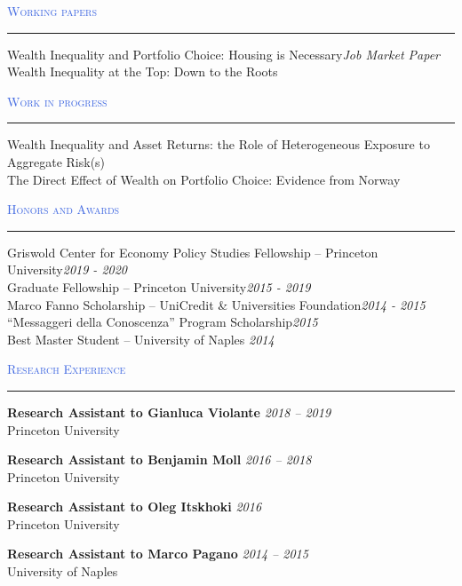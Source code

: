 \documentclass{resume} %
\renewenvironment{rSection}[1]{
\sectionskip
\textcolor{RoyalBlue}{\textsc{#1}}
\sectionlineskip
\hrule
\begin{list}{}{
\setlength{\leftmargin}{1.5em}
}
\item[]
}{
\end{list}
}
\begin{document}
\begin{rSection}{Working papers}

{Wealth Inequality and Portfolio Choice: Housing is Necessary}\hfill {\em Job Market Paper} \\

{Wealth Inequality at the Top: Down to the Roots}\hfill {}
\end{rSection}


\begin{rSection}{Work in progress}

{Wealth Inequality and Asset Returns: the Role of Heterogeneous Exposure to Aggregate Risk(s)}\hfill {} \\

{The Direct Effect of Wealth on Portfolio Choice: Evidence from Norway}\hfill {}
\end{rSection}


\begin{rSection}{Honors and Awards} \itemsep -2pt

{Griswold Center for Economy Policy Studies Fellowship -- Princeton University}\hfill {\em 2019 - 2020} \\
{Graduate Fellowship -- Princeton University}\hfill {\em 2015 - 2019} \\
{Marco Fanno Scholarship -- UniCredit \& Universities Foundation}\hfill {\em 2014 - 2015} \\
{``Messaggeri della Conoscenza'' Program Scholarship}\hfill {\em 2015} \\
{Best Master Student -- University of Naples} \hfill {\em 2014}
\end{rSection}
\newpage 


\begin{rSection}{Research Experience}

{\bf Research Assistant to Gianluca Violante} \hfill {\em 2018 -- 2019} \\
Princeton University

{\bf Research Assistant to Benjamin Moll} \hfill {\em 2016 -- 2018} \\
Princeton University

{\bf Research Assistant to Oleg Itskhoki} \hfill {\em 2016} \\
Princeton University

{\bf Research Assistant to Marco Pagano} \hfill {\em 2014 -- 2015} \\
University of Naples

\end{rSection}
\end{document}
